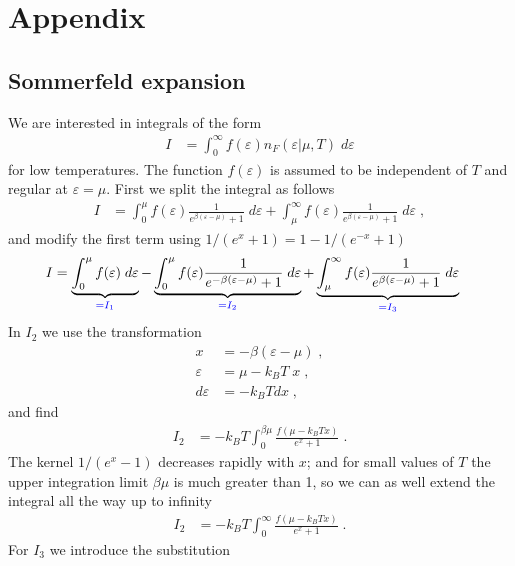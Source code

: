 
\chapter{Appendix}




\section{Sommerfeld expansion}\label{Sommerfeld}
We are interested in integrals of the form
%
\begin{align*}
I&=\int_{0}^{\infty}  f(\varepsilon) n_{F}(\varepsilon|\mu,T)\; d\varepsilon
\end{align*}
%
for low temperatures. The function $f(\varepsilon)$ is  assumed to be independent of $T$
and regular at $\varepsilon=\mu$.
First we split the integral as follows
%
\begin{align*}
I&=\int_{0}^{\mu }  f(\varepsilon) \frac{1}{e^{\beta(\varepsilon-\mu)}+1}\; d\varepsilon
+
\int_{\mu}^{\infty }  f(\varepsilon) \frac{1}{e^{\beta(\varepsilon-\mu)}+1}\;  d\varepsilon\;,
\end{align*}
%
and modify the first term using $1/(e^{x}+1)=1-1/(e^{-x}+1)$
\begin{align*}
I&=\underbrace{
\int_{0}^{\mu }  f(\varepsilon)\;d\varepsilon
}_{\color{blue} = I_{1}}
-\underbrace{
\int_{0}^{\mu }  f(\varepsilon) \frac{1}{e^{-\beta(\varepsilon-\mu)}+1}\; d\varepsilon
}_{\color{blue} = I_{2}}
+
\underbrace{
\int_{\mu}^{\infty }  f(\varepsilon) \frac{1}{e^{\beta(\varepsilon-\mu)}+1}\;  d\varepsilon
}_{\color{blue} = I_{3}}
\end{align*}
In $I_{2}$ we use the transformation 
%
\begin{align*}
x &= -\beta(\varepsilon-\mu)\;,\\
\varepsilon &= \mu- k_{B}T \;x\;,\\
d\varepsilon &= -k_{B}T d x\;,
\end{align*}
%
and find
%
\begin{align*}
I_{2} &= -k_{B}T\int_{0}^{\beta\mu} \frac{f(\mu-k_{B}T x)}{e^{x}+1}\;.
\end{align*}
%
The kernel $1/(e^{x}-1)$ decreases rapidly with $x$; and for small values of  $T$ the upper integration limit $\beta \mu$ is much greater than 1, so we can as well extend the integral all the way up 
to infinity
\begin{align*}
I_{2} &= -k_{B}T\int_{0}^{\infty} \frac{f(\mu-k_{B}T x)}{e^{x}+1}\;.
\end{align*}
%
For $I_{3}$ we introduce the substitution 
